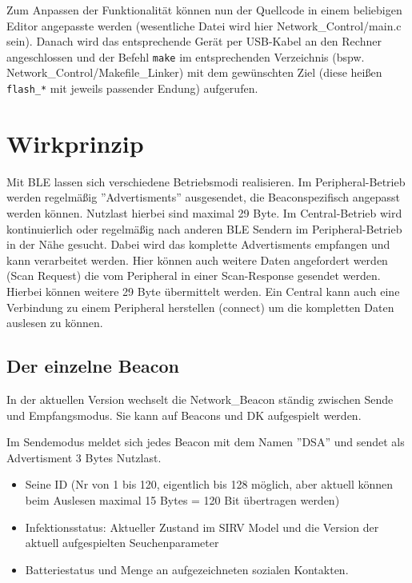 \documentclass[11pt,ngerman]{scrartcl} %
\begin{document}
Zum Anpassen der Funktionalität können nun der Quellcode in einem beliebigen Editor angepasste werden (wesentliche Datei wird hier Network\_Control/main.c sein). Danach wird das entsprechende Gerät per USB-Kabel an den Rechner angeschlossen und der Befehl \verb|make| im entsprechenden Verzeichnis (bspw. Network\_Control/Makefile\_Linker) mit dem gewünschten Ziel (diese heißen \verb|flash_*| mit jeweils passender Endung) aufgerufen.

\section{Wirkprinzip}
Mit BLE lassen sich verschiedene Betriebsmodi realisieren. Im Peripheral-Betrieb werden regelmäßig ''Advertisments'' ausgesendet, die Beaconspezifisch angepasst werden können. Nutzlast hierbei sind maximal 29 Byte. Im Central-Betrieb wird kontinuierlich oder regelmäßig nach anderen BLE Sendern im Peripheral-Betrieb in der Nähe gesucht. Dabei wird das komplette Advertisments empfangen und kann verarbeitet werden. Hier können auch weitere Daten angefordert werden (Scan Request) die vom Peripheral in einer Scan-Response gesendet werden. Hierbei können weitere 29 Byte übermittelt werden. Ein Central kann auch eine Verbindung zu einem Peripheral herstellen  (connect) um die kompletten Daten auslesen zu können.


\subsection{Der einzelne Beacon}

In der aktuellen Version wechselt die Network\_Beacon ständig zwischen Sende und Empfangsmodus. Sie kann auf Beacons und DK aufgespielt werden.

Im Sendemodus  meldet sich jedes Beacon mit dem Namen ''DSA'' und sendet als Advertisment 3 Bytes Nutzlast. 
\begin{itemize}
\item Seine ID (Nr von 1 bis 120, eigentlich bis 128 möglich, aber aktuell können beim Auslesen maximal 15 Bytes = 120 Bit übertragen werden)
\item Infektionsstatus: Aktueller Zustand im SIRV Model und die Version der aktuell aufgespielten Seuchenparameter
\item Batteriestatus und Menge an aufgezeichneten sozialen Kontakten.
\end{itemize}
\end{document}
